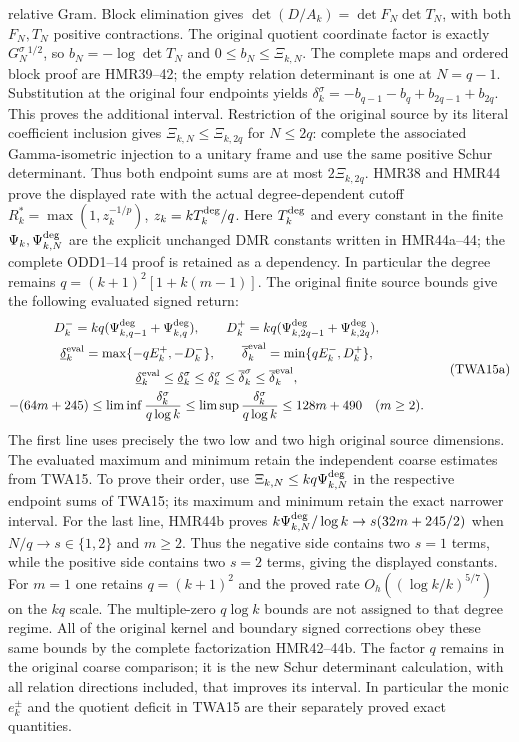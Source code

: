 \documentclass[11pt,a4paper]{article}
\begin{document}
relative Gram. Block elimination gives
$\det(D/A_k)=\det F_N\det T_N$, with both $F_N,T_N$
positive contractions. The original quotient coordinate
factor is exactly $G_N^\sigma{}^{1/2}$, so
$b_N=-\log\det T_N$ and
$0\leq b_N\leq\Xi_{k,N}$. The complete maps and ordered
block proof are HMR39--42; the empty relation determinant
is one at $N=q-1$.
Substitution at the original four endpoints yields
$\delta_k^\sigma=-b_{q-1}-b_q+b_{2q-1}+b_{2q}$.
This proves the additional interval.
Restriction of the original source by its literal coefficient
inclusion gives $\Xi_{k,N}\leq\Xi_{k,2q}$ for $N\leq2q$:
complete the associated Gamma-isometric injection to a
unitary frame and use the same positive Schur determinant.
Thus both endpoint sums are at most $2\Xi_{k,2q}$.
HMR38 and HMR44 prove the displayed rate with the actual
degree-dependent cutoff $R_k^*=\max(1,z_k^{-1/p})$,
$z_k=kT_k^{\rm deg}/q$. Here $T_k^{\rm deg}$ and every constant
in the finite $\Psi_k,\Psi_{k,N}^{\rm deg}$ are the explicit
unchanged DMR constants written in HMR44a--44; the complete
ODD1--14 proof is retained as a dependency. In particular the
degree remains $q=(k+1)^2[1+k(m-1)]$. The original finite
source bounds give the following evaluated signed return:
\[
\begin{gathered}
 D_k^-=kq(\Psi_{k,q-1}^{\rm deg}+\Psi_{k,q}^{\rm deg}),\qquad
 D_k^+=kq(\Psi_{k,2q-1}^{\rm deg}+\Psi_{k,2q}^{\rm deg}),\\
 \underline\delta_k^{\rm eval}=\max\{-qE_k^+,-D_k^-\},\qquad
 \overline\delta_k^{\rm eval}=\min\{qE_k^-,D_k^+\},\\
 \underline\delta_k^{\rm eval}\leq\underline\delta_k^\sigma
 \leq\delta_k^\sigma\leq\overline\delta_k^\sigma
                    \leq\overline\delta_k^{\rm eval},\\
 -(64m+245)\leq\liminf\frac{\delta_k^\sigma}{q\log k}
 \leq\limsup\frac{\delta_k^\sigma}{q\log k}
 \leq128m+490\quad(m\geq2).
\end{gathered}\tag{TWA15a}
\]
The first line uses precisely the two low and two high original
source dimensions. The evaluated maximum and minimum retain the
independent coarse estimates from TWA15. To prove their order, use
$\Xi_{k,N}\leq kq\Psi_{k,N}^{\rm deg}$ in the respective
endpoint sums of TWA15; its maximum and minimum retain the
exact narrower interval. For the last line, HMR44b proves
$k\Psi_{k,N}^{\rm deg}/\log k\to s(32m+245/2)$ when
$N/q\to s\in\{1,2\}$ and $m\geq2$. Thus the negative
side contains two $s=1$ terms, while the positive side
contains two $s=2$ terms, giving the displayed constants.
For $m=1$ one retains $q=(k+1)^2$ and the proved rate
$O_h((\log k/k)^{5/7})$ on the $kq$ scale. The multiple-zero
$q\log k$ bounds are not assigned to that degree regime.
All of the original kernel and boundary signed corrections
obey these same bounds by the complete factorization HMR42--44b.
The factor $q$ remains in the original coarse comparison;
it is the new Schur determinant calculation, with all
relation directions included, that improves its interval.
In particular the monic $e_k^\pm$ and the quotient deficit
in TWA15 are their separately proved exact quantities.
\end{document}
